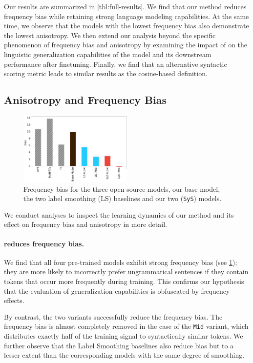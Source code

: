 Our results are summarized in \cref{tbl:full-results}. We find that our method reduces frequency bias while retaining strong language modeling capabilities. At the same time, we observe that the models with the lowest frequency bias also demonstrate the lowest anisotropy. We then extend our analysis beyond the specific phenomenon of frequency bias and anisotropy by examining the impact of \smoothing on the linguistic generalization capabilities of the model and its downstream performance after finetuning. Finally, we find that an alternative syntactic scoring metric leads to similar results as the cosine-based definition.

\subsection{Anisotropy and Frequency Bias}

\begin{figure}
    \centering
    \includegraphics[width=0.5\textwidth]{chapters/syntatic-smoothing/figures/biases.png}
    \caption{Frequency bias for the three open source models, our base model, the two label smoothing (LS) baselines and our two \smoothing (\texttt{SyS}) models.}
    \label{fig:biases}
\end{figure}

We conduct analyses to inspect the learning dynamics of our method and its effect on frequency bias and anisotropy in more detail. 

\paragraph{\smoothing reduces frequency bias.}
We find that all four pre-trained models exhibit strong frequency bias (see \cref{fig:biases}); they are more likely to incorrectly prefer ungrammatical sentences if they contain tokens that occur more frequently during training. This confirms our hypothesis that the evaluation of generalization capabilities is obfuscated by frequency effects. 

By contrast, the two \smoothing variants successfully reduce the frequency bias. The frequency bias is almost completely removed in the case of the \texttt{Mid} variant, which distributes exactly half of the training signal to syntactically similar tokens. We further observe that the Label Smoothing baselines also reduce bias but to a lesser extent than the corresponding \smoothing models with the same degree of smoothing. 


